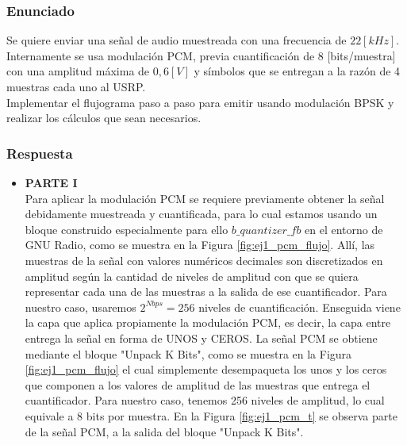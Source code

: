 \subsubsection{Enunciado}
Se quiere enviar una señal de audio muestreada con una frecuencia de $22[kHz]$. Internamente se usa modulación PCM, previa cuantificación de 8 [bits/muestra] con una amplitud máxima de $0,6[V]$ y símbolos que se entregan a la razón de 4 muestras cada uno al USRP.\\
Implementar el flujograma paso a paso para emitir usando modulación BPSK y realizar los cálculos que sean necesarios.
\subsubsection{Respuesta}
\begin{itemize}

\item \textbf{PARTE I}\\
Para aplicar la modulación PCM se requiere previamente obtener la señal debidamente muestreada y cuantificada, para lo cual estamos usando un bloque construido especialmente para ello $b\_quantizer\_fb$ en el entorno de GNU Radio, como se muestra en la Figura \ref{fig:ej1_pcm_flujo}. Allí, las muestras de la señal con valores numéricos decimales son discretizados en amplitud según la cantidad de niveles de amplitud con que se quiera representar cada una de las muestras a la salida de ese cuantificador. Para nuestro caso, usaremos $2^{Nbps} = 256$ niveles de cuantificación. Enseguida viene la capa que aplica propiamente la modulación PCM, es decir, la capa entre entrega la señal en forma de UNOS y CEROS. La señal PCM se obtiene mediante el bloque "Unpack K Bits", como se muestra en la Figura \ref{fig:ej1_pcm_flujo} el cual simplemente desempaqueta los unos y los ceros que componen a los valores de amplitud de las muestras que entrega el cuantificador. Para nuestro caso, tenemos 256 niveles de amplitud, lo cual equivale a 8 bits por muestra. En la Figura \ref{fig:ej1_pcm_t} se observa parte de la señal PCM, a la salida del bloque "Unpack K Bits".  


\end{itemize}
